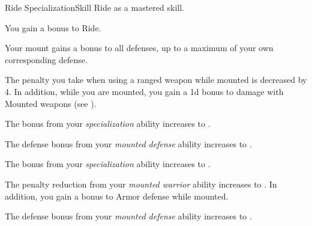     \begin{feat}{Ride Specialization}{Skill}
        \featpre Ride as a mastered skill.

         You gain a  bonus to Ride.

         Your mount gains a  bonus to all defenses, up to a maximum of your own corresponding defense.

         The penalty you take when using a ranged weapon while mounted is decreased by 4.
        In addition, while you are mounted, you gain a \plus1d bonus to damage with Mounted weapons (see ).

         The bonus from your \textit{specialization} ability increases to .

         The defense bonus from your \textit{mounted defense} ability increases to .

         The bonus from your \textit{specialization} ability increases to .

         The penalty reduction from your \textit{mounted warrior} ability increases to .
        In addition, you gain a  bonus to Armor defense while mounted.

         The defense bonus from your \textit{mounted defense} ability increases to .
    \end{feat}


